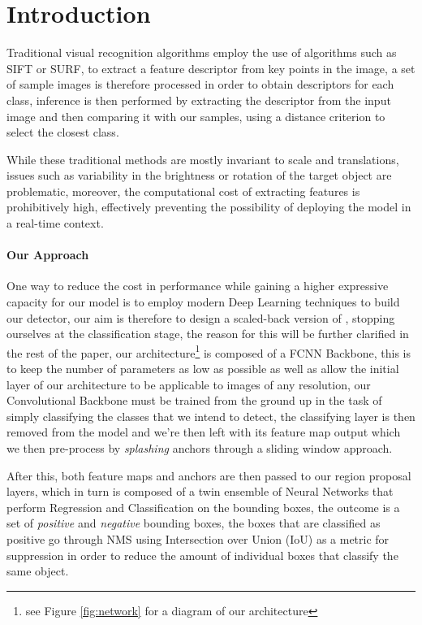 \documentclass[10pt,journal,cspaper,compsoc]{IEEEtran}
\begin{document}
    \section{Introduction}
    Traditional visual recognition algorithms employ the use of algorithms such as SIFT 
    or SURF\cite{Lowe:SIFT,Bay:SURF}, to extract a feature descriptor from key points 
    in the image, a set of sample images is therefore processed in order to obtain descriptors 
    for each class, inference is then performed by extracting the descriptor from the input image 
    and then comparing it with our samples, using a distance criterion to select the closest class.

    While these traditional methods are mostly invariant to scale and translations, issues such as 
    variability in the brightness or rotation of the target object are problematic, moreover, the 
    computational cost of extracting features is prohibitively high, effectively preventing the possibility
    of deploying the model in a real-time context.

    \paragraph*{Our Approach}
    One way to reduce the cost in performance while gaining a higher expressive capacity for our model is to employ
    modern Deep Learning techniques to build our detector, our aim is therefore to 
    design a scaled-back version of \cite{arxiv:FasterRCNN}, stopping ourselves at the classification stage,
    the reason for this will be further clarified in the rest of the paper, our architecture\footnote{see 
    Figure \ref{fig:network} for a diagram
    of our architecture} is composed of a FCNN\cite{Chen:FCNN,Simonyan:VCC16} Backbone, this is to keep the number 
    of parameters as low as possible as well as allow the initial layer of our architecture to be applicable to images 
    of any resolution, our Convolutional Backbone must be trained from the ground up in the task of simply classifying 
    the classes that we intend to detect, the classifying layer is then removed from the model and we're then
    left with its feature map output which we then pre-process by \emph{splashing} anchors through a sliding window 
    approach.

        

    After this, both feature maps and anchors are then passed to our region proposal layers, which in turn is composed 
    of a twin ensemble of Neural Networks that perform Regression and Classification on the bounding boxes, the outcome is a set of 
    \emph{positive} and \emph{negative} bounding boxes, the boxes that are classified as positive 
    go through NMS\cite{Neubeck:NMS} using Intersection over Union (IoU) \cite{Rezatofighi:IoU} as a metric for suppression
    in order to reduce the amount of individual boxes that classify the same object.
\end{document}
